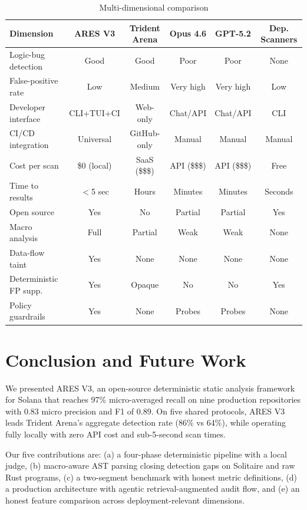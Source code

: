 \documentclass[conference]{IEEEtran}
\begin{document}
\begin{table}[htbp]
  \caption{Multi-dimensional comparison}
  \label{tab:features}
  \centering
  \small
  \begin{tabular}{p{2.8cm}ccccc}
    \hline
    Dimension & ARES V3 & Trident Arena & Opus 4.6 & GPT-5.2 & Dep. Scanners \\
    \hline
    Logic-bug detection & Good & Good & Poor & Poor & None \\
    False-positive rate & Low & Medium & Very high & Very high & Low \\
    Developer interface & CLI+TUI+CI & Web-only & Chat/API & Chat/API & CLI \\
    CI/CD integration & Universal & GitHub-only & Manual & Manual & Manual \\
    Cost per scan & \$0 (local) & SaaS (\$\$\$) & API (\$\$\$) & API (\$\$\$) & Free \\
    Time to results & $<$5 sec & Hours & Minutes & Minutes & Seconds \\
    Open source & Yes & No & Partial & Partial & Yes \\
    Macro analysis & Full & Partial & Weak & Weak & None \\
    Data-flow taint & Yes & None & None & None & None \\
    Deterministic FP supp. & Yes & Opaque & No & No & Yes \\
    Policy guardrails & Yes & None & Probes & Probes & None \\
    \hline
  \end{tabular}
\end{table}

\section{Conclusion and Future Work}
\label{sec:conclude}

We presented ARES V3, an open-source deterministic static analysis framework for Solana that reaches 97\% micro-averaged recall on nine production repositories with 0.83 micro precision and F1 of 0.89. On five shared protocols, ARES V3 leads Trident Arena'{}s aggregate detection rate (86\% vs 64\%), while operating fully locally with zero API cost and sub-5-second scan times.

Our five contributions are: (a) a four-phase deterministic pipeline with a local judge, (b) macro-aware AST parsing closing detection gaps on Solitaire and raw Rust programs, (c) a two-segment benchmark with honest metric definitions, (d) a production architecture with agentic retrieval-augmented audit flow, and (e) an honest feature comparison across deployment-relevant dimensions.
\end{document}
